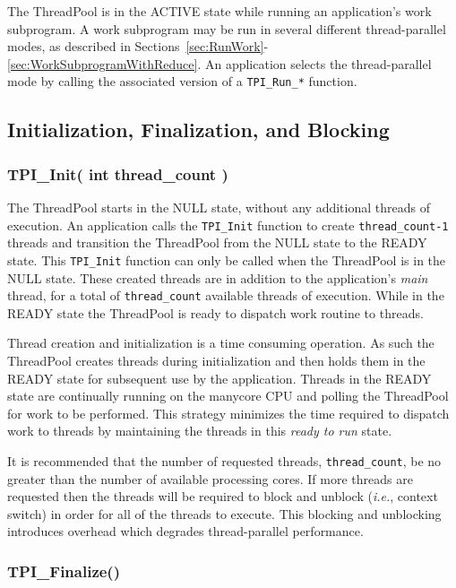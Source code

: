 The ThreadPool is in the ACTIVE state while running an application's work subprogram.
%
A work subprogram may be run in several different thread-parallel modes, 
as described in Sections~\ref{sec:RunWork}-\ref{sec:WorkSubprogramWithReduce}.
%
An application selects the thread-parallel mode by calling the associated version of a 
\texttt{TPI\_Run\_*} function.


\clearpage
\subsection{Initialization, Finalization, and Blocking}

\subsubsection{TPI\_Init( int thread\_count )}

The ThreadPool starts in the NULL state, without any additional threads of execution.
%
An application calls the \texttt{TPI\_Init} function to create \texttt{thread\_count-1} threads and transition the ThreadPool from the NULL state to the READY state.
%
This \texttt{TPI\_Init} function can only be called when the ThreadPool is in the NULL state.
%
These created threads are in addition to the application's \emph{main} thread, for a total of 
\texttt{thread\_count} available threads of execution.
%
While in the READY state the ThreadPool is ready to dispatch work routine to threads.


Thread creation and initialization is a time consuming operation.
%
As such the ThreadPool creates threads during initialization and then holds them in the READY state for subsequent use by the application.
%
Threads in the READY state are continually running on the manycore CPU and polling the ThreadPool for work to be performed.
%
This strategy minimizes the time required to dispatch work to threads by maintaining the threads in this \emph{ready to run} state.


It is recommended that the number of requested threads, \texttt{thread\_count}, be no greater than the number of available processing cores.
%
If more threads are requested then the threads will be required to block and unblock 
(\emph{i.e.}, context switch) in order for all of the threads to execute.
%
This blocking and unblocking introduces overhead which degrades thread-parallel performance.


\subsubsection{TPI\_Finalize()}

